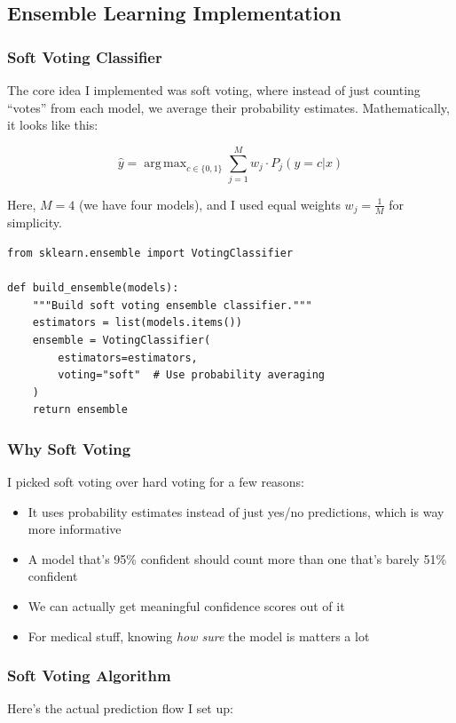 \documentclass[12pt]{article}
\DeclareMathOperator*{\argmax}{arg\,max}
\begin{document}
\subsection{Ensemble Learning Implementation}

\subsubsection{Soft Voting Classifier}
The core idea I implemented was soft voting, where instead of just counting ``votes'' from each model, we average their probability estimates. Mathematically, it looks like this:

\begin{equation}
\hat{y} = \argmax_{c \in \{0,1\}} \sum_{j=1}^{M} w_j \cdot P_j(y=c|x)
\end{equation}

Here, $M=4$ (we have four models), and I used equal weights $w_j = \frac{1}{M}$ for simplicity.

\begin{lstlisting}[style=pythonstyle, caption={Soft Voting Ensemble Implementation}]
from sklearn.ensemble import VotingClassifier

def build_ensemble(models):
    """Build soft voting ensemble classifier."""
    estimators = list(models.items())
    ensemble = VotingClassifier(
        estimators=estimators,
        voting="soft"  # Use probability averaging
    )
    return ensemble
\end{lstlisting}

\subsubsection{Why Soft Voting}
I picked soft voting over hard voting for a few reasons:
\begin{itemize}
    \item It uses probability estimates instead of just yes/no predictions, which is way more informative
    \item A model that's 95\% confident should count more than one that's barely 51\% confident
    \item We can actually get meaningful confidence scores out of it
    \item For medical stuff, knowing \textit{how sure} the model is matters a lot
\end{itemize}

\subsubsection{Soft Voting Algorithm}
Here's the actual prediction flow I set up:
\end{document}
